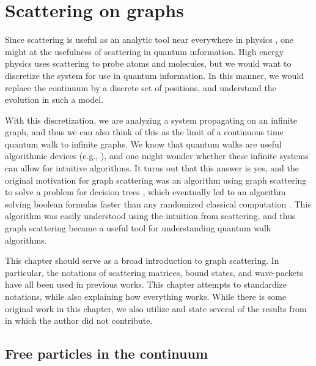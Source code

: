 \documentclass[../thesis-main/thesis-main]{subfiles}
\begin{document}
\chapter{Scattering on graphs}
\label{chap:scattering_on_graphs}


Since scattering is useful as an analytic tool near everywhere in physics \cite{RSScat}, one might at the usefulness of scattering in quantum information.  High energy physics uses scattering to probe atoms and molecules, but we would want to discretize the system for use in quantum information.  In this manner, we would replace the continuum by a discrete set of positions, and understand the evolution in such a model.

With this discretization, we are analyzing a system propagating on an infinite graph, and thus we can also think of this as the limit of a continuous time quantum walk to infinite graphs.  We know that quantum walks are useful algorithmic devices (e.g., \cite{CCDFGS03,Amb07}), and one might wonder whether these infinite systems can allow for intuitive algorithms.  It turns out that this answer is yes, and the original motivation for graph scattering was an algorithm using graph scattering to solve a problem for decision trees \cite{FG98}, which eventually led to an algorithm solving boolean formulas faster than any randomized classical computation \cite{FGG08}.  This algorithm was easily understood using the intuition from scattering, and thus graph scattering became a useful tool for understanding quantum walk algorithms.

This chapter should serve as a broad introduction to graph scattering.  In particular, the notations of scattering matrices, bound states, and wave-packets have all been used in previous works.  This chapter attempts to standardize notations, while also explaining how everything works.  While there is some original work in this chapter, we also utilize and state several of the results from \cite{FGG08,Chi09,CS11,CG12} in which the author did not contribute.

\section{Free particles in the continuum}
\end{document}

